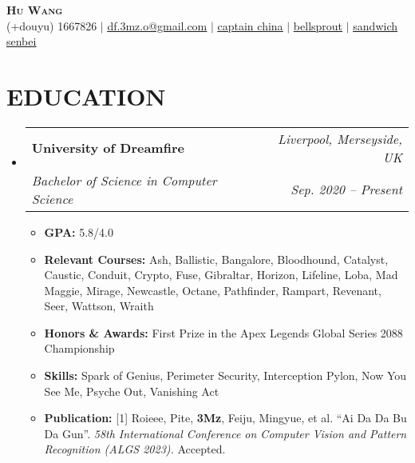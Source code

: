 \documentclass[letterpaper, 11pt]{article}
\makeatletter
\newcommand{\resumeItem}[1]{
	\item\small{
		{#1 \vspace{-2pt}}
	}
}
\newcommand{\resumeSubheading}[4]{
	\vspace{-2pt}\item
	\begin{tabular*}{0.97\textwidth}[t]{l@{\extracolsep{\fill}}r}
		\textbf{#1} & #2 \\
		\textit{\small#3} & \textit{\small #4} \\
	\end{tabular*}\vspace{-7pt}
}
\newcommand{\resumeSubHeadingListStart}{\begin{itemize}[leftmargin=0in, label={}]}
\newcommand{\resumeSubHeadingListEnd}{\end{itemize}}
\newcommand{\resumeItemListStart}{\begin{itemize}}
\newcommand{\resumeItemListEnd}{\end{itemize}\vspace{-5pt}}
\makeatother
\begin{document}
	\begin{center}
		\textbf{\Huge \scshape Hu Wang} \\ \vspace{10pt}
		\small \faPhone \hspace{1pt} (+douyu) 1667826 $ | $ 
		\href{mailto:df.3mz.o@gmail.com}{\underline{\faEnvelope \hspace{1pt} df.3mz.o@gmail.com}} $ | $ 
		\href{https://liquipedia.net/apexlegends/3Mz}{\underline{ \faHome \hspace{1pt} captain china}} $ | $ 
		\href{https://www.douyu.com/1667826}{\underline{\faLinkedin \hspace{1pt} bellsprout}} $ | $
		\href{https://space.bilibili.com/38979291 }{\underline{\faGithub \hspace{1pt} sandwich senbei}}
	\end{center}
	
	\section{EDUCATION}
	\resumeSubHeadingListStart
	\resumeSubheading
	{University of Dreamfire}{\textit{Liverpool, Merseyside, UK}}
	{Bachelor of Science in Computer Science}{\textit{Sep. 2020 – Present}}
	\resumeItemListStart
	\resumeItem{\textbf{GPA:} 5.8/4.0}
	\resumeItem{\textbf{Relevant Courses:} Ash, Ballistic, Bangalore, Bloodhound, Catalyst, Caustic, Conduit, Crypto, Fuse, Gibraltar, Horizon, Lifeline, Loba, Mad Maggie, Mirage, Newcastle, Octane, Pathfinder, Rampart, Revenant, Seer, Wattson, Wraith}
	\resumeItem{\textbf{Honors \& Awards:} First Prize in the Apex Legends Global Series 2088 Championship}
	\resumeItem{\textbf{Skills:} Spark of Genius, Perimeter Security, Interception Pylon, Now You See Me, Psyche Out, Vanishing Act}
	\resumeItem{\textbf{Publication:} [1] Roieee, Pite, \textbf{3Mz}, Feiju, Mingyue, et al. “Ai Da Da Bu Da Gun”. \textit{58th International Conference on Computer Vision and Pattern Recognition (ALGS 2023).} Accepted.}
	\resumeItemListEnd
	\resumeSubHeadingListEnd
	
\end{document}
